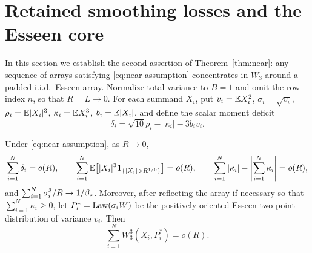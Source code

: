 \section{Retained smoothing losses and the Esseen core}\label{sec:shape}

In this section we establish the second assertion of Theorem~\ref{thm:near}:
any sequence of arrays satisfying \eqref{eq:near-assumption} concentrates in
$W_3$ around a padded i.i.d.\ Esseen array. Normalize total variance to
$B=1$ and omit the row index $n$, so that $R=L\to0$. For each summand $X_i$,
put $v_i=\mathbb E X_i^2$, $\sigma_i=\sqrt{v_i}$, $\rho_i=\mathbb E|X_i|^3$,
$\kappa_i=\mathbb E X_i^3$, $b_i=\mathbb E|X_i|$, and define the scalar moment deficit
\[
 \delta_i=\sqrt{10}\rho_i-|\kappa_i|-3b_iv_i.
\]

\begin{lemma}\label{lem:retained}
Under \eqref{eq:near-assumption}, as $R\to0$,
\begin{equation}\label{eq:retained-losses}
 \sum_{i=1}^N\delta_i=o(R),\qquad
 \sum_{i=1}^N\E\bigl[|X_i|^3\ind_{\{|X_i|>R^{1/6}\}}\bigr]=o(R),\qquad
 \sum_{i=1}^N|\kappa_i|-\left|\sum_{i=1}^N\kappa_i\right|=o(R),
\end{equation}
and $\sum_{i=1}^N\sigma_i^3/R\to1/\beta_*$. Moreover, after reflecting the array
if necessary so that $\sum_{i=1}^N\kappa_i\ge0$, let $P_i^*=\operatorname{Law}(\sigma_i W)$
be the positively oriented Esseen two-point distribution of variance $v_i$.
Then
\begin{equation}\label{eq:shape-W3}
                  \sum_{i=1}^N W_3^3(X_i,P_i^*)=o(R).
\end{equation}
\end{lemma}

